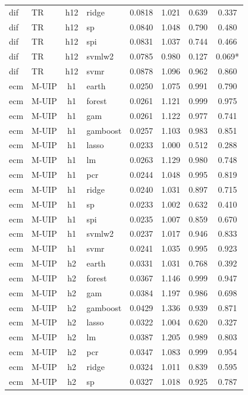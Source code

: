 \begin{ThreePartTable}
\begin{longtable}[t]{llclcccc}
dif & TR & h12 & ridge & 0.0818 & 1.021 & 0.639 & 0.337\\
dif & TR & h12 & sp & 0.0840 & 1.048 & 0.790 & 0.480\\
dif & TR & h12 & spi & 0.0831 & 1.037 & 0.744 & 0.466\\
dif & TR & h12 & svmlw2 & 0.0785 & 0.980 & 0.127 & 0.069*\\
dif & TR & h12 & svmr & 0.0878 & 1.096 & 0.962 & 0.860\\
\addlinespace
ecm & M-UIP & h1 & earth & 0.0250 & 1.075 & 0.991 & 0.790\\
ecm & M-UIP & h1 & forest & 0.0261 & 1.121 & 0.999 & 0.975\\
ecm & M-UIP & h1 & gam & 0.0261 & 1.122 & 0.977 & 0.741\\
ecm & M-UIP & h1 & gamboost & 0.0257 & 1.103 & 0.983 & 0.851\\
ecm & M-UIP & h1 & lasso & 0.0233 & 1.000 & 0.512 & 0.288\\
ecm & M-UIP & h1 & lm & 0.0263 & 1.129 & 0.980 & 0.748\\
ecm & M-UIP & h1 & pcr & 0.0244 & 1.048 & 0.995 & 0.819\\
ecm & M-UIP & h1 & ridge & 0.0240 & 1.031 & 0.897 & 0.715\\
ecm & M-UIP & h1 & sp & 0.0233 & 1.002 & 0.632 & 0.410\\
ecm & M-UIP & h1 & spi & 0.0235 & 1.007 & 0.859 & 0.670\\
ecm & M-UIP & h1 & svmlw2 & 0.0237 & 1.017 & 0.946 & 0.833\\
ecm & M-UIP & h1 & svmr & 0.0241 & 1.035 & 0.995 & 0.923\\
\addlinespace
ecm & M-UIP & h2 & earth & 0.0331 & 1.031 & 0.768 & 0.392\\
ecm & M-UIP & h2 & forest & 0.0367 & 1.146 & 0.999 & 0.947\\
ecm & M-UIP & h2 & gam & 0.0384 & 1.197 & 0.986 & 0.698\\
ecm & M-UIP & h2 & gamboost & 0.0429 & 1.336 & 0.939 & 0.871\\
ecm & M-UIP & h2 & lasso & 0.0322 & 1.004 & 0.620 & 0.327\\
ecm & M-UIP & h2 & lm & 0.0387 & 1.205 & 0.989 & 0.803\\
ecm & M-UIP & h2 & pcr & 0.0347 & 1.083 & 0.999 & 0.954\\
ecm & M-UIP & h2 & ridge & 0.0324 & 1.011 & 0.839 & 0.595\\
ecm & M-UIP & h2 & sp & 0.0327 & 1.018 & 0.925 & 0.787\\

\end{longtable}
\end{ThreePartTable}
